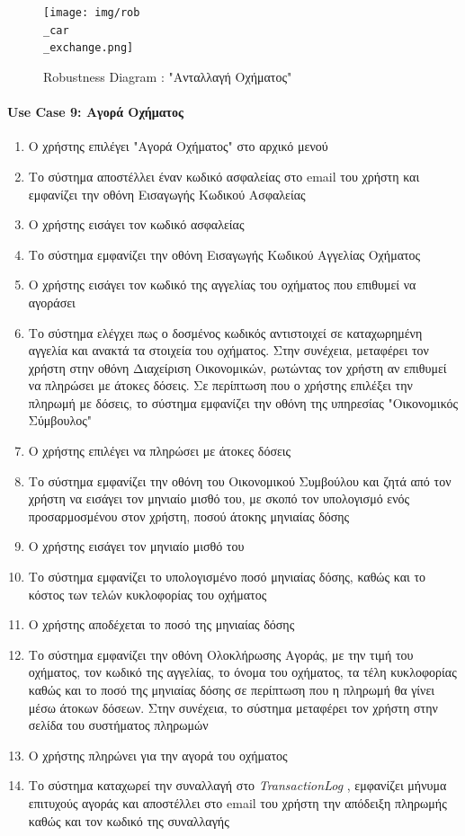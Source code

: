 \documentclass{../ol-softwaremanual}
\begin{document}
	\begin{figure}[htbp!]
		\texttt{[image: img/rob\\\_car\\\_exchange.png]}
		\caption{\en Robustness Diagram : "\gr Ανταλλαγή Οχήματος\en"\gr}
	\end{figure}
	
	
	
	\newpage
	\centering
	
	\paragraph{\en Use Case 9: \gr Αγορά Οχήματος\gr}
	
	\begin{enumerate}
		\item Ο χρήστης επιλέγει \en"\gr Αγορά Οχήματος\en" \gr στο αρχικό μενού
		\item Το σύστημα αποστέλλει έναν κωδικό ασφαλείας στο \en email \gr του χρήστη και εμφανίζει την οθόνη Εισαγωγής Κωδικού Ασφαλείας
		\item Ο χρήστης εισάγει τον κωδικό ασφαλείας		
		\item Το σύστημα εμφανίζει την οθόνη Εισαγωγής Κωδικού Αγγελίας Οχήματος
		\item Ο χρήστης εισάγει τον κωδικό της αγγελίας	του οχήματος που επιθυμεί να αγοράσει
		\item Το σύστημα ελέγχει πως ο δοσμένος κωδικός αντιστοιχεί σε καταχωρημένη αγγελία και ανακτά τα στοιχεία του οχήματος. Στην συνέχεια, μεταφέρει τον χρήστη στην οθόνη Διαχείριση Οικονομικών, ρωτώντας τον χρήστη αν επιθυμεί να πληρώσει με άτοκες δόσεις. Σε περίπτωση που ο χρήστης επιλέξει την πληρωμή με δόσεις, το σύστημα εμφανίζει την οθόνη της υπηρεσίας \en"\gr Οικονομικός Σύμβουλος\en"\gr
		\item Ο χρήστης επιλέγει να πληρώσει με άτοκες δόσεις
		\item Το σύστημα εμφανίζει την οθόνη του Οικονομικού Συμβούλου και ζητά από τον χρήστη να εισάγει τον μηνιαίο μισθό του, με σκοπό τον υπολογισμό ενός προσαρμοσμένου στον χρήστη, ποσού άτοκης μηνιαίας δόσης
		\item Ο χρήστης εισάγει τον μηνιαίο μισθό του
		\item Το σύστημα εμφανίζει το υπολογισμένο ποσό μηνιαίας δόσης, καθώς και το κόστος των τελών κυκλοφορίας του οχήματος
		\item Ο χρήστης αποδέχεται το ποσό της μηνιαίας δόσης
		\item Το σύστημα εμφανίζει την οθόνη Ολοκλήρωσης Αγοράς, με την τιμή του οχήματος, τον κωδικό της αγγελίας, το όνομα του οχήματος, τα τέλη κυκλοφορίας καθώς και το ποσό της μηνιαίας δόσης σε περίπτωση που η πληρωμή θα γίνει μέσω άτοκων δόσεων. Στην συνέχεια, το σύστημα μεταφέρει τον χρήστη στην σελίδα του συστήματος πληρωμών
		\item Ο χρήστης πληρώνει για την αγορά του οχήματος
		\item Το σύστημα καταχωρεί την συναλλαγή στο \en \textit{TransactionLog} \gr, εμφανίζει μήνυμα επιτυχούς αγοράς και αποστέλλει στο \en email \gr του χρήστη την απόδειξη πληρωμής καθώς και τον κωδικό της συναλλαγής
	\end{enumerate}
	
\end{document}
